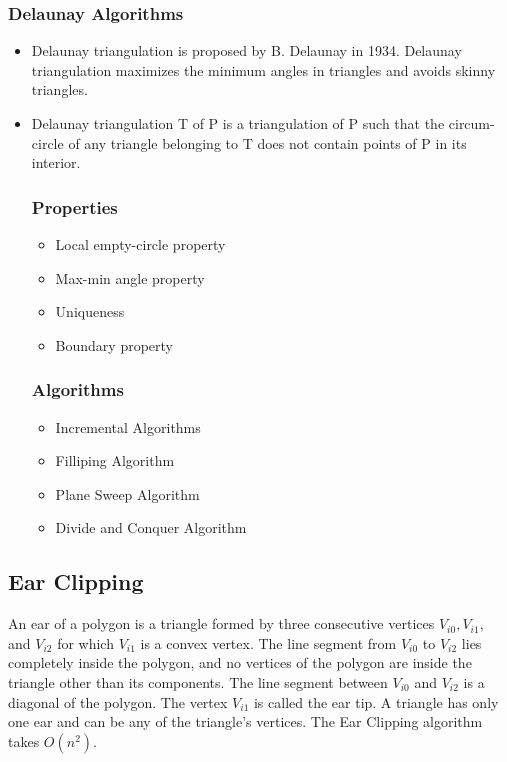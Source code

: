 \documentclass[conference]{IEEEtran}
\begin{document}
    \subsubsection{\textbf{Delaunay Algorithms}}
    \begin{itemize}
        \item Delaunay triangulation is proposed by B. Delaunay in 1934. Delaunay triangulation maximizes the minimum angles in triangles and avoids skinny triangles.
        \item Delaunay triangulation T of P is a triangulation of P such that the circum-circle of any triangle belonging to T does not contain points of P in its interior.
        \subsubsection{Properties}
        \begin{itemize}
            \item Local empty-circle property
            \item Max-min angle property
            \item Uniqueness
            \item Boundary property
        \end{itemize}
        \subsubsection{Algorithms}
        \begin{itemize}
            \item Incremental Algorithms
            \item Filliping Algorithm
            \item Plane Sweep Algorithm
            \item Divide and Conquer Algorithm
        \end{itemize}
    \end{itemize}
\subsection{Ear Clipping}
An ear of a polygon is a triangle formed by three consecutive vertices $V_{i0},V_{i1},$ and $V_{i2}$ for which $V_{i1}$ is a convex vertex. The line segment from $V_{i0}$ to $V_{i2}$ lies completely inside the polygon, and no vertices of the polygon are inside the triangle other than its components. The line segment between $V_{i0}$ and $V_{i2}$ is a diagonal of the polygon. The vertex $V_{i1}$ is called the ear tip. A triangle has only one ear and can be any of the triangle's vertices. The Ear Clipping algorithm takes $O(n^2)$.
\end{document}
